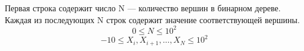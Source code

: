 Первая строка содержит число N --- количество вершин в бинарном дереве. Каждая из последующих N строк содержит значение соответствующей вершины.
\vspace{1em}
$$0\le N\le 10^2$$
$$-10\le X_i, X_{i+1}, \ldots, X_N\le 10^2$$
